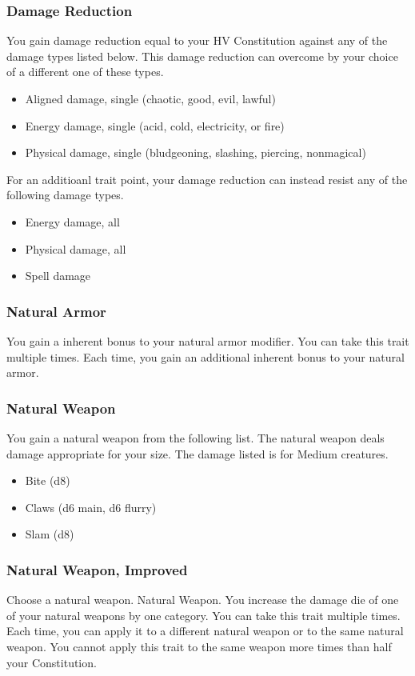\subsubsection{Damage Reduction}
\featben You gain damage reduction equal to your HV \add Constitution against any of the damage types listed below. This damage reduction can overcome by your choice of a different one of these types.
\begin{itemize}
    \item Aligned damage, single (chaotic, good, evil, lawful)
    \item Energy damage, single (acid, cold, electricity, or fire)
    \item Physical damage, single (bludgeoning, slashing, piercing, nonmagical)
\end{itemize}
 For an additioanl trait point, your damage reduction can instead resist any of the following damage types.
\begin{itemize}
    \item Energy damage, all
    \item Physical damage, all
    \item Spell damage
\end{itemize}

\subsubsection{Natural Armor}
\featben You gain a  inherent bonus to your natural armor modifier.
 You can take this trait multiple times. Each time, you gain an additional  inherent bonus to your natural armor.

\subsubsection{Natural Weapon}
\featben You gain a natural weapon from the following list. The natural weapon deals damage appropriate for your size. The damage listed is for Medium creatures.
\begin{itemize}
    \item Bite (d8)
    \item Claws (d6 main, d6 flurry)
    \item Slam (d8)
\end{itemize}

\subsubsection{Natural Weapon, Improved}
Choose a natural weapon.
\featpre Natural Weapon.
\featben You increase the damage die of one of your natural weapons by one category.
 You can take this trait multiple times. Each time, you can apply it to a different natural weapon or to the same natural weapon. You cannot apply this trait to the same weapon more times than half your Constitution. 


